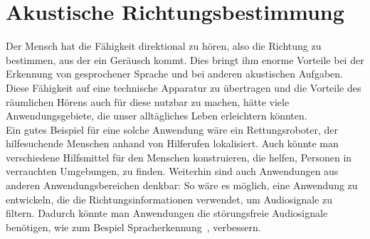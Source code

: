\section{Akustische Richtungsbestimmung}
Der Mensch hat die Fähigkeit direktional zu hören, also die Richtung zu bestimmen, aus der ein Geräusch kommt. Dies bringt ihm enorme Vorteile bei der Erkennung von gesprochener Sprache und bei anderen akustischen Aufgaben. Diese Fähigkeit auf eine technische Apparatur zu übertragen und die Vorteile des räumlichen Hörens auch für diese nutzbar zu machen, hätte viele Anwendungsgebiete, die unser alltägliches Leben erleichtern könnten.\\
Ein gutes Beispiel für eine solche Anwendung wäre ein Rettungsroboter, der hilfesuchende Menschen anhand von Hilferufen lokalisiert. Auch könnte man verschiedene Hilfsmittel für den Menschen konstruieren, die helfen, Personen in verrauchten Umgebungen, zu finden.
Weiterhin sind auch Anwendungen aus anderen Anwendungsbereichen denkbar: So wäre es möglich, eine Anwendung zu entwickeln, die die Richtungsinformationen verwendet, um Audiosignale zu filtern. Dadurch könnte man Anwendungen die störungsfreie Audiosignale benötigen, wie zum Bespiel Spracherkennung~\cite{Spracherkennung}, verbessern.